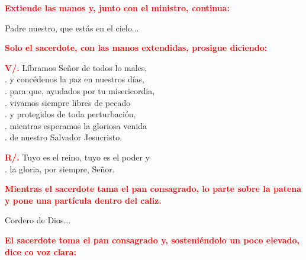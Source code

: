 \documentclass[12pt, letterpaper]{report}
\begin{document}
\large{\bfseries \textcolor{red}{Extiende las manos y, junto con el ministro, continua:}}\newline

\Large Padre nuestro, que est\'as en el cielo...\newline

\newpage

\large{\bfseries \textcolor{red}{Solo el sacerdote, con las manos extendidas, prosigue diciendo:}}\newline

\noindent
\Large {\bfseries \textcolor{red}{V/.}} \hspace{0.5cm} L\'ibramos Se\~nor de todos lo males,\\
. \hspace{1.5cm} y conc\'edenos la paz en nuestros d\'ias,\\
. \hspace{1.5cm} para que, ayudados por tu misericordia,\\
. \hspace{1.5cm} vivamos siempre libres de pecado\\
. \hspace{1.5cm} y protegidos de toda perturbaci\'on,\\
. \hspace{1.5cm} mientras esperamos la gloriosa venida\\
. \hspace{1.5cm} de nuestro Salvador Jesucristo.\newline

\noindent
\Large {\bfseries \textcolor{red}{R/.}} \hspace{0.5cm} Tuyo es el reino, tuyo es el poder y \\
. \hspace{1.5cm} la gloria, por siempre, Se\~nor. \newline


\large{\bfseries \textcolor{red}{Mientras el sacerdote tama el pan consagrado, lo parte sobre la patena y pone una part\'icula dentro del caliz.}}\newline

\Large Cordero de Dios...\newline

\large{\bfseries \textcolor{red}{El sacerdote toma el pan consagrado y, sosteni\'endolo un poco elevado, dice co voz clara:}}\newline
\end{document}
